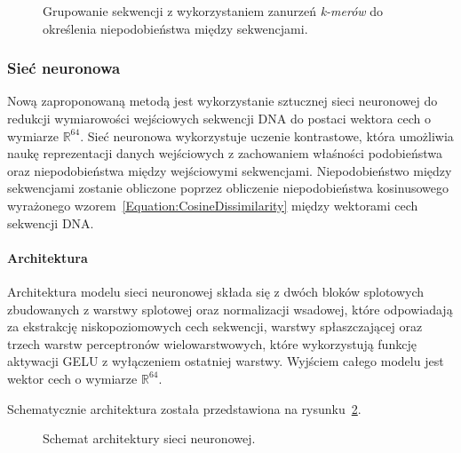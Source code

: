             \begin{figure}
                \begin{center}
                    
                \end{center}
                \caption{
                    Grupowanie sekwencji z wykorzystaniem zanurzeń \textit{k-merów} do określenia niepodobieństwa między sekwencjami.
                }\label{Picture:Cluster:KMer}
            \end{figure}

        \subsubsection{Sieć neuronowa}

            Nową zaproponowaną metodą jest wykorzystanie sztucznej sieci neuronowej do redukcji wymiarowości wejściowych sekwencji DNA do postaci wektora cech o wymiarze $\mathbb{R}^{64}$. Sieć neuronowa wykorzystuje uczenie kontrastowe\cite{}, która umożliwia naukę reprezentacji danych wejściowych z zachowaniem właśności podobieństwa oraz niepodobieństwa między wejściowymi sekwencjami. Niepodobieństwo między sekwencjami zostanie obliczone poprzez obliczenie niepodobieństwa kosinusowego wyrażonego wzorem~\eqref{Equation:CosineDissimilarity} między wektorami cech sekwencji DNA.

            \paragraph{Architektura}
                Architektura modelu sieci neuronowej składa się z dwóch bloków splotowych zbudowanych z warstwy splotowej oraz normalizacji wsadowej, które odpowiadają za ekstrakcję niskopoziomowych cech sekwencji, warstwy spłaszczającej oraz trzech warstw perceptronów wielowarstwowych, które wykorzystują funkcję aktywacji GELU\cite{GELU} z wyłączeniem ostatniej warstwy. Wyjściem całego modelu jest wektor cech o wymiarze $\mathbb{R}^{64}$. 

                Schematycznie architektura została przedstawiona na rysunku~\ref{Picture:NeuralModel}. 

                \begin{figure}
                    \begin{center}
                        
                    \end{center}
                    \caption{
                        Schemat architektury sieci neuronowej.
                    }\label{Picture:NeuralModel}
                \end{figure}

